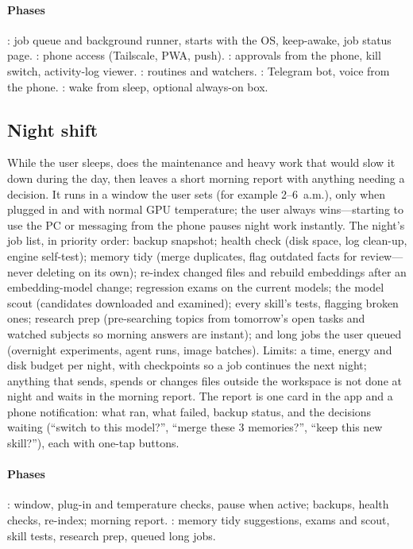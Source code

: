 \paragraph{Phases} : job queue and background runner, starts with the OS, keep-awake, job status page. : phone access (Tailscale, PWA, push). : approvals from the phone, kill switch, activity-log viewer. : routines and watchers. : Telegram bot, voice from the phone. : wake from sleep, optional always-on box.

\subsection{Night shift}

While the user sleeps, \hivi{} does the maintenance and heavy work that would slow it down during the day, then leaves a short morning report with anything needing a decision. It runs in a window the user sets (for example 2--6~a.m.), only when plugged in and with normal GPU temperature; the user always wins---starting to use the PC or messaging from the phone pauses night work instantly. The night's job list, in priority order: backup snapshot; health check (disk space, log clean-up, engine self-test); memory tidy (merge duplicates, flag outdated facts for review---never deleting on its own); re-index changed files and rebuild embeddings after an embedding-model change; regression exams on the current models; the model scout (candidates downloaded and examined); every skill's tests, flagging broken ones; research prep (pre-searching topics from tomorrow's open tasks and watched subjects so morning answers are instant); and long jobs the user queued (overnight experiments, agent runs, image batches). Limits: a time, energy and disk budget per night, with checkpoints so a job continues the next night; anything that sends, spends or changes files outside the workspace is not done at night and waits in the morning report. The report is one card in the app and a phone notification: what ran, what failed, backup status, and the decisions waiting (``switch to this model?'', ``merge these 3 memories?'', ``keep this new skill?''), each with one-tap buttons.

\paragraph{Phases} : window, plug-in and temperature checks, pause when active; backups, health checks, re-index; morning report. : memory tidy suggestions, exams and scout, skill tests, research prep, queued long jobs.

